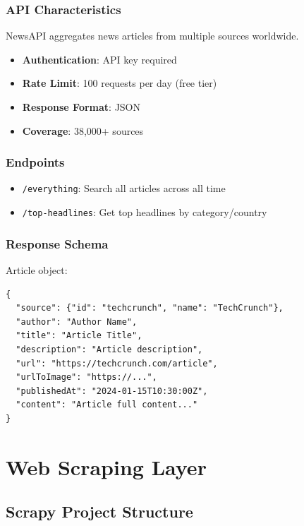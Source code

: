 \documentclass[12pt,a4paper]{report}
\begin{document}
\subsection{API Characteristics}

NewsAPI aggregates news articles from multiple sources worldwide.

\begin{itemize}
    \item \textbf{Authentication}: API key required
    \item \textbf{Rate Limit}: 100 requests per day (free tier)
    \item \textbf{Response Format}: JSON
    \item \textbf{Coverage}: 38,000+ sources
\end{itemize}

\subsection{Endpoints}

\begin{itemize}
    \item \texttt{/everything}: Search all articles across all time
    \item \texttt{/top-headlines}: Get top headlines by category/country
\end{itemize}

\subsection{Response Schema}

Article object:

\begin{lstlisting}
{
  "source": {"id": "techcrunch", "name": "TechCrunch"},
  "author": "Author Name",
  "title": "Article Title",
  "description": "Article description",
  "url": "https://techcrunch.com/article",
  "urlToImage": "https://...",
  "publishedAt": "2024-01-15T10:30:00Z",
  "content": "Article full content..."
}
\end{lstlisting}

\chapter{Web Scraping Layer}

\section{Scrapy Project Structure}
\end{document}
